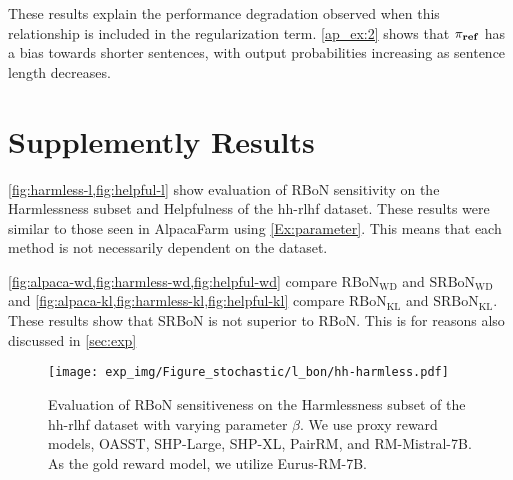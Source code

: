 These results explain the performance degradation observed when this relationship is included in the regularization term. \cref{ap_ex:2} shows that $\pi_{\textnormal{\textbf{ref}}}$ has a bias towards shorter sentences, with output probabilities increasing as sentence length decreases.



\newpage

\section{Supplemently Results}\label{appendix:all_method}
\cref{fig:harmless-l,fig:helpful-l} show evaluation of RBoN sensitivity on the Harmlessness subset and Helpfulness of the hh-rlhf dataset. These results were similar to those seen in AlpacaFarm using \cref{Ex:parameter}. This means that each method is not necessarily dependent on the dataset.

\cref{fig:alpaca-wd,fig:harmless-wd,fig:helpful-wd} compare $\mathrm{RBoN}_{\mathrm{WD}}$ and $\mathrm{SRBoN}_{\mathrm{WD}}$ and \cref{fig:alpaca-kl,fig:harmless-kl,fig:helpful-kl} compare $\mathrm{RBoN}_{\mathrm{KL}}$ and $\mathrm{SRBoN}_{\mathrm{KL}}$. These results show that SRBoN is not superior to RBoN. This is for reasons also discussed in \cref{sec:exp}




\begin{figure}[htbp]
    \centering
    \texttt{[image: exp\_img/Figure\_stochastic/l\_bon/hh-harmless.pdf]}
    \caption{
    Evaluation of RBoN sensitiveness on the Harmlessness subset of the hh-rlhf dataset with varying parameter $\beta$. We use proxy reward models, OASST, SHP-Large, SHP-XL,  PairRM, and RM-Mistral-7B. As the gold reward model, we utilize Eurus-RM-7B.
    }
    \label{fig:harmless-l}
\end{figure}

